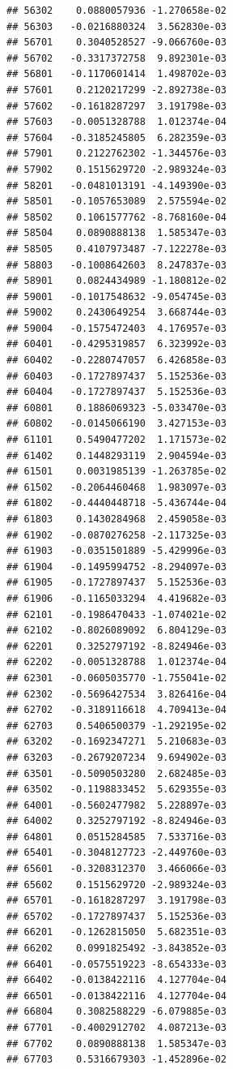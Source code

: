 \begin{frame}[fragile]
\begin{verbatim}
## 56302    0.0880057936 -1.270658e-02
## 56303   -0.0216880324  3.562830e-03
## 56701    0.3040528527 -9.066760e-03
## 56702   -0.3317372758  9.892301e-03
## 56801   -0.1170601414  1.498702e-03
## 57601    0.2120217299 -2.892738e-03
## 57602   -0.1618287297  3.191798e-03
## 57603   -0.0051328788  1.012374e-04
## 57604   -0.3185245805  6.282359e-03
## 57901    0.2122762302 -1.344576e-03
## 57902    0.1515629720 -2.989324e-03
## 58201   -0.0481013191 -4.149390e-03
## 58501   -0.1057653089  2.575594e-02
## 58502    0.1061577762 -8.768160e-04
## 58504    0.0890888138  1.585347e-03
## 58505    0.4107973487 -7.122278e-03
## 58803   -0.1008642603  8.247837e-03
## 58901    0.0824434989 -1.180812e-02
## 59001   -0.1017548632 -9.054745e-03
## 59002    0.2430649254  3.668744e-03
## 59004   -0.1575472403  4.176957e-03
## 60401   -0.4295319857  6.323992e-03
## 60402   -0.2280747057  6.426858e-03
## 60403   -0.1727897437  5.152536e-03
## 60404   -0.1727897437  5.152536e-03
## 60801    0.1886069323 -5.033470e-03
## 60802   -0.0145066190  3.427153e-03
## 61101    0.5490477202  1.171573e-02
## 61402    0.1448293119  2.904594e-03
## 61501    0.0031985139 -1.263785e-02
## 61502   -0.2064460468  1.983097e-03
## 61802   -0.4440448718 -5.436744e-04
## 61803    0.1430284968  2.459058e-03
## 61902   -0.0870276258 -2.117325e-03
## 61903   -0.0351501889 -5.429996e-03
## 61904   -0.1495994752 -8.294097e-03
## 61905   -0.1727897437  5.152536e-03
## 61906   -0.1165033294  4.419682e-03
## 62101   -0.1986470433 -1.074021e-02
## 62102   -0.8026089092  6.804129e-03
## 62201    0.3252797192 -8.824946e-03
## 62202   -0.0051328788  1.012374e-04
## 62301   -0.0605035770 -1.755041e-02
## 62302   -0.5696427534  3.826416e-04
## 62702   -0.3189116618  4.709413e-04
## 62703    0.5406500379 -1.292195e-02
## 63202   -0.1692347271  5.210683e-03
## 63203   -0.2679207234  9.694902e-03
## 63501   -0.5090503280  2.682485e-03
## 63502   -0.1198833452  5.629355e-03
## 64001   -0.5602477982  5.228897e-03
## 64002    0.3252797192 -8.824946e-03
## 64801    0.0515284585  7.533716e-03
## 65401   -0.3048127723 -2.449760e-03
## 65601   -0.3208312370  3.466066e-03
## 65602    0.1515629720 -2.989324e-03
## 65701   -0.1618287297  3.191798e-03
## 65702   -0.1727897437  5.152536e-03
## 66201   -0.1262815050  5.682351e-03
## 66202    0.0991825492 -3.843852e-03
## 66401   -0.0575519223 -8.654333e-03
## 66402   -0.0138422116  4.127704e-04
## 66501   -0.0138422116  4.127704e-04
## 66804    0.3082588229 -6.079885e-03
## 67701   -0.4002912702  4.087213e-03
## 67702    0.0890888138  1.585347e-03
## 67703    0.5316679303 -1.452896e-02

\end{verbatim}
\end{frame}
